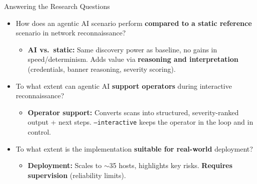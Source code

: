 \begin{frame}{Answering the Research Questions}
    \begin{itemize}
        \item<1->[\textbf{RQ1}] How does an agentic AI scenario perform \textbf{compared to a static reference} scenario in network reconnaissance?
        \begin{itemize}
            \item<1-> \footnotesize \textbf{AI vs.\ static:} Same discovery power as baseline, no gains in speed/determinism. Adds value via \textbf{reasoning and interpretation} (credentials, banner reasoning, severity scoring).
        \end{itemize}
        \vspace{0.3em}
        \item<2->[\textbf{RQ2}] To what extent can agentic AI \textbf{support operators} during interactive reconnaissance?
        \begin{itemize}
            \item<2-> \footnotesize \textbf{Operator support:} Converts scans into structured, severity-ranked output + next steps. \texttt{--interactive} keeps the operator in the loop and in control.
        \end{itemize}
        \vspace{0.3em}
        \item<3->[\textbf{RQ3}] To what extent is the implementation \textbf{suitable for real-world} deployment?
        \begin{itemize}
            \item<3-> \footnotesize \textbf{Deployment:} Scales to $\sim$35 hosts, highlights key risks. \textbf{Requires supervision} (reliability limits).
        \end{itemize}
    \end{itemize}
\end{frame}

